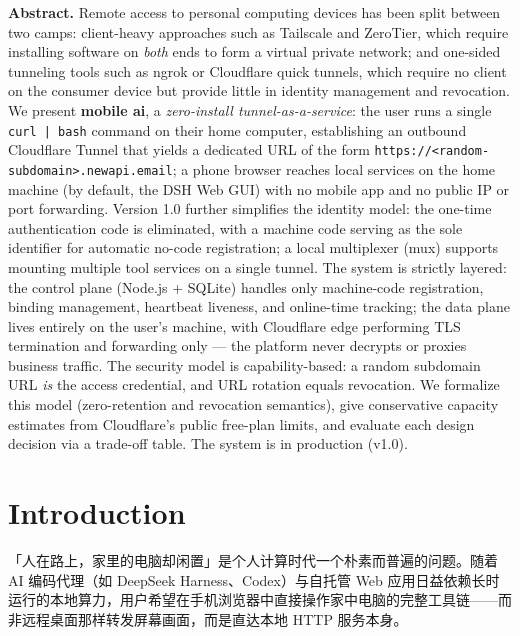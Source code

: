 \documentclass[10pt,a4paper]{article}
\newcommand{\sys}{mobile ai}
\begin{document}
\vspace{1em}
\noindent\textbf{Abstract.} Remote access to personal computing devices has been split between two camps: client-heavy approaches such as Tailscale and ZeroTier, which require installing software on \textit{both} ends to form a virtual private network; and one-sided tunneling tools such as ngrok or Cloudflare quick tunnels, which require no client on the consumer device but provide little in identity management and revocation. We present \textbf{\sys}, a \textit{zero-install tunnel-as-a-service}: the user runs a single \texttt{curl\ | bash} command on their home computer, establishing an outbound Cloudflare Tunnel that yields a dedicated URL of the form \texttt{https://<random-subdomain>.newapi.email}; a phone browser reaches local services on the home machine (by default, the DSH Web GUI) with no mobile app and no public IP or port forwarding. Version 1.0 further simplifies the identity model: the one-time authentication code is eliminated, with a machine code serving as the sole identifier for automatic no-code registration; a local multiplexer (mux) supports mounting multiple tool services on a single tunnel. The system is strictly layered: the control plane (Node.js + SQLite) handles only machine-code registration, binding management, heartbeat liveness, and online-time tracking; the data plane lives entirely on the user's machine, with Cloudflare edge performing TLS termination and forwarding only --- the platform never decrypts or proxies business traffic. The security model is capability-based: a random subdomain URL \textit{is} the access credential, and URL rotation equals revocation. We formalize this model (zero-retention and revocation semantics), give conservative capacity estimates from Cloudflare's public free-plan limits, and evaluate each design decision via a trade-off table. The system is in production (v1.0).

\section{Introduction}

「人在路上，家里的电脑却闲置」是个人计算时代一个朴素而普遍的问题。随着 AI 编码代理（如 DeepSeek Harness、Codex）与自托管 Web 应用日益依赖长时运行的本地算力，用户希望在手机浏览器中直接操作家中电脑的完整工具链——而非远程桌面那样转发屏幕画面，而是直达本地 HTTP 服务本身。
\end{document}
